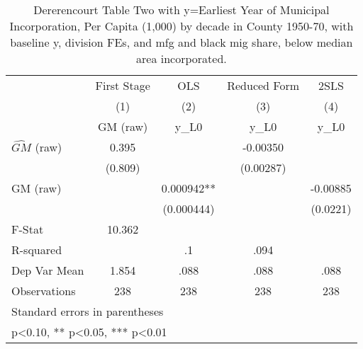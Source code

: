 \begin{table}[htbp]\centering
\def\sym#1{\ifmmode^{#1}\else\(^{#1}\)\fi}
\caption{Dererencourt Table Two with y=Earliest Year of Municipal Incorporation, Per Capita (1,000) by decade in County 1950-70, with baseline y, division FEs, and mfg and black mig share, below median area incorporated.}
\begin{tabular}{l*{4}{c}}
\toprule
                    & First Stage   &         OLS   &Reduced Form   &        2SLS   \\
                    &\multicolumn{1}{c}{(1)}&\multicolumn{1}{c}{(2)}&\multicolumn{1}{c}{(3)}&\multicolumn{1}{c}{(4)}\\
                    &\multicolumn{1}{c}{GM  (raw)}&\multicolumn{1}{c}{y\_L0}&\multicolumn{1}{c}{y\_L0}&\multicolumn{1}{c}{y\_L0}\\
\midrule
$\hat{GM}$ (raw)    &       0.395   &               &    -0.00350   &               \\
                    &     (0.809)   &               &   (0.00287)   &               \\
\addlinespace
GM  (raw)           &               &    0.000942** &               &    -0.00885   \\
                    &               &  (0.000444)   &               &    (0.0221)   \\
\midrule
F-Stat              &      10.362   &               &               &               \\
R-squared           &               &          .1   &        .094   &               \\
Dep Var Mean        &       1.854   &        .088   &        .088   &        .088   \\
Observations        &         238   &         238   &         238   &         238   \\
\bottomrule
\multicolumn{5}{l}{\footnotesize Standard errors in parentheses}\\
\multicolumn{5}{l}{\footnotesize * p<0.10, ** p<0.05, *** p<0.01}\\
\end{tabular}
\end{table}
